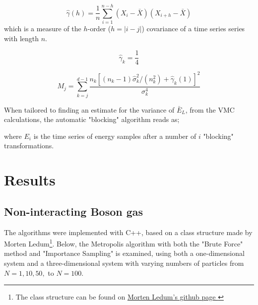 \documentclass[%
oneside,                 %
final,                   %
10pt]{article}
\begin{document}
\begin{equation}
\hat \gamma(h)=\frac{1}{n} \sum_{i=1}^{n-h} (X_i-\bar X)(X_{i+h}-\bar X) 
\label{eq:samplecovar}
\end{equation}
which is a measure of the $h$-order ($h=|i-j|$) covariance of a time series series with length $n$. 

\begin{equation}
\hat \gamma_k=\frac{1}{4}
\end{equation}


\begin{equation}
M_j=\sum_{k=j}^{d-1} \frac{n_k\left[(n_k-1)\hat \sigma_k^2/(n_k^2)+\hat \gamma_k(1)\right]^2}{\sigma_k^4}
\label{eq:M}
\end{equation}

When tailored to finding an estimate for the variance of $\bar E_L$, from the VMC calculations, the automatic "blocking" algorithm reads as;
\begin{center}\end{center}
where $E_i$ is the time series of energy samples after a number of $i$ "blocking" transformations.


\section{Results} \label{results}
\subsection{Non-interacting Boson gas}
The algorithms were implemented with C++, based on a class structure made by Morten Ledum\footnote{The class structure can be found on \href{https://github.com/mortele/variational-monte-carlo-fys4411}{Morten Ledum's github page }}. Below, the Metropolis algorithm with both the  "Brute Force" method and "Importance Sampling" is examined, using both a one-dimensional system and a three-dimensional system with varying numbers of particles from $N=1,10,50,$ to $N=100$. 
\end{document}
